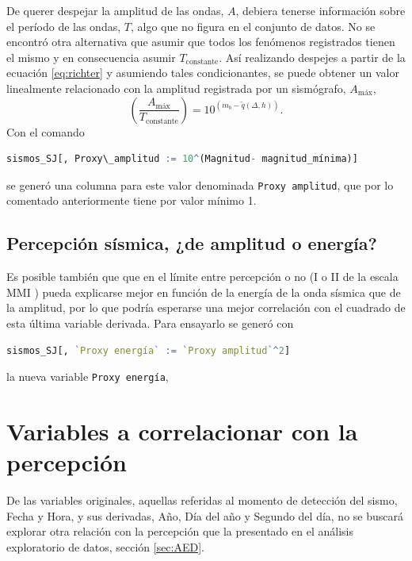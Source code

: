 \documentclass[a4paper]{report}
\begin{document}
De querer despejar la amplitud de las ondas, \(A\), debiera tenerse información sobre el período de las ondas, \(T\), algo que no figura en el conjunto de datos.
No se encontró otra alternativa que asumir que todos los fenómenos registrados tienen el mismo y en consecuencia asumir \(T_\text{constante}\).
Así realizando despejes a partir de la ecuación \ref{eq:richter} y asumiendo tales condicionantes, se puede obtener un valor linealmente relacionado con la amplitud registrada por un sismógrafo, \(A_\text{máx}\),
\begin{equation}
	\left( \frac{A_\text{máx}}{T_\text{constante}} \right) = 10^{(m_b - \tilde{q}(\Delta, h))}.
	\label{eq:linealizacionMagnitud_final} 
\end{equation}
Con el comando
\begin{lstlisting}[breaklines=true, language=R]
sismos_SJ[, Proxy\_amplitud := 10^(Magnitud- magnitud_mínima)]
\end{lstlisting}
se generó una columna para este valor denominada \lstinline[language=R,breaklines=true,basicstyle=\ttfamily]'Proxy amplitud', que por lo comentado anteriormente tiene por valor mínimo \num{1}. 



\subsection{Percepción sísmica, ¿de amplitud o energía?}
Es posible también que que en el límite entre percepción o no (I o II de la escala MMI \cite{noauthor_intensidad_2022}) pueda explicarse mejor en función de la energía de la onda sísmica que de la amplitud, por lo que podría esperarse una mejor correlación con el cuadrado de esta última variable derivada.
Para ensayarlo se generó con
\begin{lstlisting}[breaklines=true, language=R]
sismos_SJ[, `Proxy energía` := `Proxy amplitud`^2]
\end{lstlisting}
la nueva variable \lstinline[language=R,breaklines=true,basicstyle=\ttfamily]'Proxy energía', 


\section{Variables a correlacionar con la percepción}\label{sec:correlaciones}
De las variables originales, aquellas referidas al momento de detección del sismo, Fecha y Hora, y sus derivadas, Año, Día del año y Segundo del día, no se buscará explorar otra relación con la percepción que la presentado en el análisis exploratorio de datos, sección \ref{sec:AED}.
\end{document}
